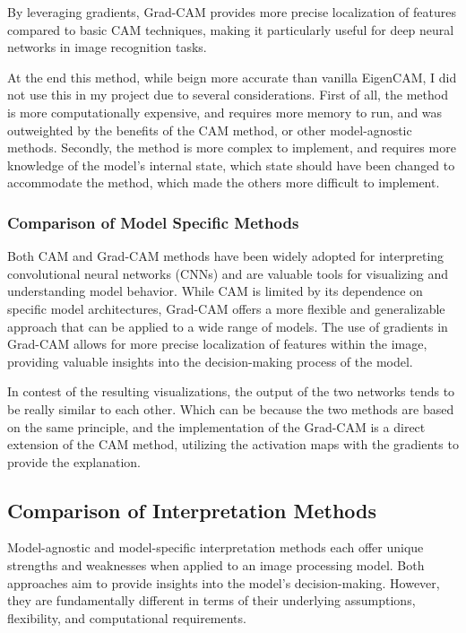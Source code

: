 By leveraging gradients, Grad-CAM provides more precise localization of features compared to basic CAM techniques,
making it particularly useful for deep neural networks in image recognition tasks.

At the end this method, while beign more accurate than vanilla EigenCAM, I did not use this in my project due
to several considerations.
First of all, the method is more computationally expensive, and requires more memory to run, and was outweighted by the
benefits of the CAM method, or other model-agnostic methods.
Secondly, the method is more complex to implement, and requires more knowledge of the model's internal state,
which state should have been changed to accommodate the method, which made the others more difficult to implement.

\subsubsection{Comparison of Model Specific Methods}\label{subsubsec:comparison-of-model-specific-methods}

Both CAM and Grad-CAM methods have been widely adopted for interpreting convolutional neural networks (CNNs)
and are valuable tools for visualizing and understanding model behavior.
While CAM is limited by its dependence on specific model architectures, Grad-CAM offers a more flexible and
generalizable approach that can be applied to a wide range of models.
The use of gradients in Grad-CAM allows for more precise localization of features within the image,
providing valuable insights into the decision-making process of the model.

In contest of the resulting visualizations, the output of the two networks tends to be really similar to each other.
Which can be because the two methods are based on the same principle, and the implementation of the Grad-CAM
is a direct extension of the CAM method, utilizing the activation maps with the gradients to provide the explanation.

\subsection{Comparison of Interpretation Methods}\label{subsec:evaluation-interpretation-methods}


Model-agnostic and model-specific interpretation methods each offer unique strengths and weaknesses when applied to
an image processing model.
Both approaches aim to provide insights into the model's decision-making.
However, they are fundamentally different in terms of their underlying assumptions, flexibility, and computational requirements.


